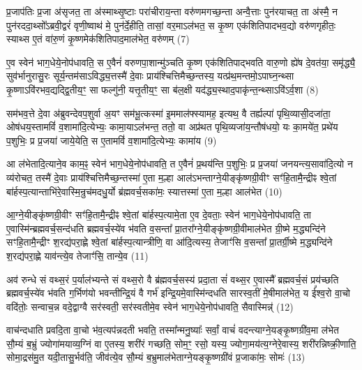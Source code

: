 प्र॒जाप॑तिः प्र॒जा अ॑सृजत॒ ता अ॑स्माथ्सृ॒ष्टाः परा॑चीराय॒न्ता वरु॑णमगच्छ॒न्ता अन्वै॒त्ताः पुन॑रयाचत॒ ता अ॑स्मै॒ न पुन॑रददा॒थ्सो᳚\-ऽब्रवी॒द्वरं॑ वृणी॒ष्वाथ॑ मे॒ पुन॑र्दे॒हीति॒ तासां॒ वर॒मा\-ऽल॑भत॒ स कृ॒ष्ण एक॑शितिपादभव॒द्यो वरु॑णगृहीतः॒ स्याथ्स ए॒तं वा॑रु॒णं कृ॒ष्णमेक॑शितिपाद॒माल॑भेत॒ वरु॑णम् (7)

ए॒व स्वेन॑ भाग॒धेये॒नोप॑धावति॒ स ए॒वैनं॑ वरुणपा॒शान्मु॑ञ्चति कृ॒ष्ण एक॑शितिपाद्भवति वारु॒णो ह्ये॑ष दे॒वत॑या॒ समृ॑द्ध्यै॒ सुव॑र्भानुरासु॒रः सूर्य॒न्तम॑सा\-ऽविद्ध्य॒त्तस्मै॑ दे॒वाः प्राय॑श्चित्तिमैच्छ॒न्तस्य॒ यत्प्र॑थ॒मन्तमो॒\-ऽपाघ्न॒न्थ्सा कृ॒ष्णा\-ऽवि॑रभव॒द्यद्द्वि॒तीय॒ꣳ॒ सा फल्गु॑नी॒ यत्तृ॒तीय॒ꣳ॒ सा ब॑ल॒क्षी यद॑द्ध्य॒स्थाद॒पाकृ॑न्त॒न्थ्सा\-ऽवि॑\-ऽर्व॒शा (8)

सम॑भव॒त्ते दे॒वा अ॑ब्रुवन्देवप॒शुर्वा अ॒यꣳ सम॑भू॒त्कस्मा॑ इ॒ममाल॑फ्स्यामह॒ इत्यथ॒ वै तर्ह्यल्पा॑ पृथि॒व्यासी॒दजा॑ता॒ ओष॑धय॒स्तामविं॑ व॒शामा॑दि॒त्येभ्यः॒ कामा॒या\-ऽल॑भन्त॒ ततो॒ वा अप्र॑थत पृथि॒व्यजा॑य॒न्तौष॑धयो॒ यः का॒मये॑त॒ प्रथे॑य प॒शुभिः॒ प्र प्र॒जया॑ जाये॒येति॒ स ए॒तामविं॑ व॒शामा॑दि॒त्येभ्यः॒ कामा॑य (9)

आ ल॑भेतादि॒त्याने॒व काम॒ꣴ॒ स्वेन॑ भाग॒धेये॒नोप॑धावति॒ त ए॒वैनं॑ प्र॒थय॑न्ति प॒शुभिः॒ प्र प्र॒जया॑ जनयन्त्य॒सावा॑दि॒त्यो न व्य॑रोचत॒ तस्मै॑ दे॒वाः प्राय॑श्चित्तिमैच्छ॒न्तस्मा॑ ए॒ता म॒ल्\mbox{}हा आल॑\-ऽभन्ताग्ने॒यीङ्कृ॑ष्णग्री॒वीꣳ सꣳ॑हि॒तामै॒न्द्रीꣴ श्वे॒तां बा॑र्\mbox{}हस्प॒त्यान्ताभि॑रे॒वास्मि॒न्रुच॑मदधु॒र्यो ब्र॑ह्मवर्च॒सका॑मः॒ स्यात्तस्मा॑ ए॒ता म॒ल्\mbox{}हा आल॑भेत (10)

आ॒ग्ने॒यीङ्कृ॑ष्णग्री॒वीꣳ सꣳ॑हि॒तामै॒न्द्रीꣴ श्वे॒तां बा॑र्\mbox{}हस्प॒त्यामे॒ता ए॒व दे॒वताः॒ स्वेन॑ भाग॒धेये॒नोप॑धावति॒ ता ए॒वास्मि॑न्ब्रह्मवर्च॒सन्द॑धति ब्रह्मवर्च॒स्ये॑व भ॑वति व॒सन्ता᳚ प्रा॒तरा᳚ग्ने॒यीङ्कृ॑ष्णग्री॒वीमाल॑भेत ग्री॒ष्मे म॒द्ध्यन्दि॑ने सꣳहि॒तामै॒न्द्रीꣳ श॒रद्य॑परा॒ह्णे श्वे॒तां बा॑र्\mbox{}हस्प॒त्यान्त्रीणि॒ वा आ॑दि॒त्यस्य॒ तेजाꣳ॑सि व॒सन्ता᳚ प्रा॒तर्ग्री॒ष्मे म॒द्ध्यन्दि॑ने श॒रद्य॑परा॒ह्णे याव॑न्त्ये॒व तेजाꣳ॑सि॒ तान्ये॒व (11)

अव॑ रुन्धे सं वथ्स॒रं प॒र्याल॑भ्यन्ते सं वथ्स॒रो वै ब्र॑ह्मवर्च॒सस्य॑ प्रदा॒ता सं॑ वथ्स॒र ए॒वास्मै᳚ ब्रह्मवर्च॒सं प्रय॑च्छति ब्रह्मवर्च॒स्ये॑व भ॑वति ग॒र्भिण॑यो भवन्तीन्द्रि॒यं वै गर्भ॑ इन्द्रि॒यमे॒वास्मि॑न्दधति सारस्व॒तीं मे॒षीमाल॑भेत॒ य ई᳚श्व॒रो वा॒चो वदि॑तोः॒ सन्वाच॒न्न वदे॒द्वाग्वै सर॑स्वती॒ सर॑स्वतीमे॒व स्वेन॑ भाग॒धेये॒नोप॑धावति॒ सैवास्मिन्न्॑ (12)

वाच॑न्दधाति प्रवदि॒ता वा॒चो भ॑व॒त्यप॑न्नदती भवति॒ तस्मा᳚न्मनु॒ष्याः᳚ सर्वां॒ वाचं॑ वदन्त्याग्ने॒यङ्कृ॒ष्णग्री॑व॒मा ल॑भेत सौ॒म्यं ब॒भ्रुं ज्योगा॑मयाव्य॒ग्निं वा ए॒तस्य॒ शरी॑रं गच्छति॒ सोम॒ꣳ॒ रसो॒ यस्य॒ ज्योगा॒मय॑त्य॒ग्नेरे॒वास्य॒ शरी॑रन्निष्क्री॒णाति॒ सोमा॒द्रस॑मु॒त यदी॒तासु॒र्भव॑ति॒ जीव॑त्ये॒व सौ॒म्यं ब॒भ्रुमाल॑भेताग्ने॒यङ्कृ॒ष्णग्री॑वं प्र॒जाका॑मः॒ सोमः॑ (13)

